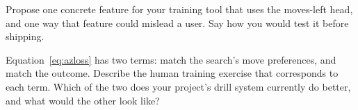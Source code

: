 \begin{exercises}
 Propose one concrete feature for your training tool that uses
the moves-left head, and one way that feature could mislead a user. Say how you would test it
before shipping.

 Equation~\eqref{eq:azloss} has two terms: match
the search's move preferences, and match the outcome. Describe the human training exercise
that corresponds to each term. Which of the two does your project's drill system currently do
better, and what would the other look like?

\end{exercises}
